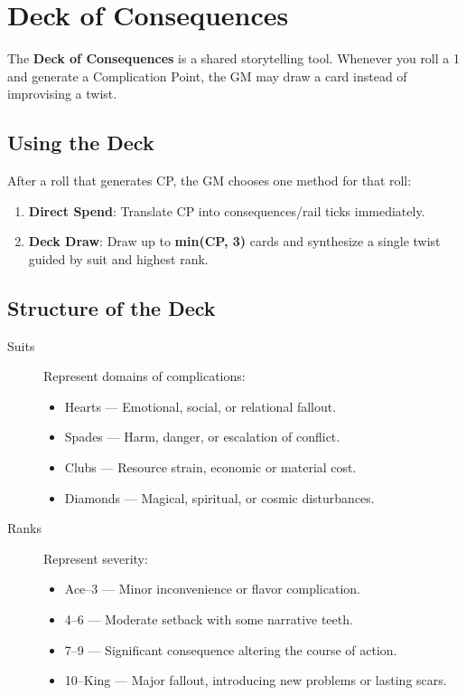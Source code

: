\section{Deck of Consequences}

The \textbf{Deck of Consequences} is a shared storytelling tool. Whenever you roll a 1 and generate a Complication Point, the GM may draw a card instead of improvising a twist.

\subsection*{Using the Deck}

After a roll that generates CP, the GM chooses one method for that roll:
\begin{enumerate}
  \item \textbf{Direct Spend}: Translate CP into consequences/rail ticks immediately.
  \item \textbf{Deck Draw}: Draw up to \textbf{min(CP, 3)} cards and synthesize a single twist guided by suit and highest rank.
\end{enumerate}

\subsection*{Structure of the Deck}

\begin{description}
  \item[Suits] Represent domains of complications:
    \begin{itemize}
      \item Hearts — Emotional, social, or relational fallout.
      \item Spades — Harm, danger, or escalation of conflict.
      \item Clubs — Resource strain, economic or material cost.
      \item Diamonds — Magical, spiritual, or cosmic disturbances.
    \end{itemize}
  \item[Ranks] Represent severity:
    \begin{itemize}
      \item Ace–3 — Minor inconvenience or flavor complication.
      \item 4–6 — Moderate setback with some narrative teeth.
      \item 7–9 — Significant consequence altering the course of action.
      \item 10–King — Major fallout, introducing new problems or lasting scars.
    \end{itemize}
\end{description}

